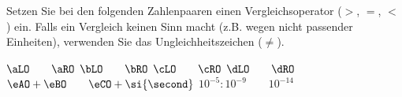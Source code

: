 Setzen Sie bei den folgenden Zahlenpaaren einen Vergleichsoperator ($>$, $=$, $<$) ein. Falls ein Vergleich keinen Sinn macht (z.B. wegen nicht passender Einheiten), verwenden Sie das Ungleichheitszeichen ($\neq$).

\begin{abcliste}
\abc $\aLO \qquad \aRO$
\abc $\bLO \qquad \bRO$
\abc $\cLO \qquad \cRO$
\abc $\dLO \qquad \dRO$
\abc $\eAO + \eBO \qquad \eCO + \si{\second}$
\abc $10^{-5} : 10^{-9} \qquad 10^{-14}$
\end{abcliste}
